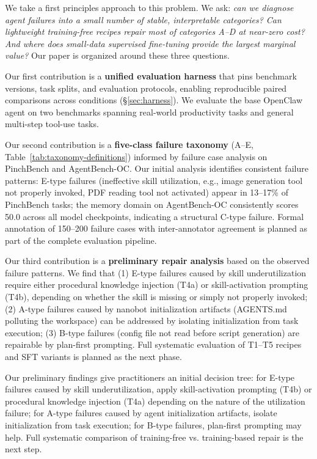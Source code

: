We take a first principles approach to this problem. We ask: \emph{can we diagnose agent failures into a small number of stable, interpretable categories? Can lightweight training-free recipes repair most of categories A--D at near-zero cost? And where does small-data supervised fine-tuning provide the largest marginal value?} Our paper is organized around these three questions.

Our first contribution is a \textbf{unified evaluation harness} that pins benchmark versions, task splits, and evaluation protocols, enabling reproducible paired comparisons across conditions (\S\ref{sec:harness}). We evaluate the base OpenClaw agent on two benchmarks spanning real-world productivity tasks and general multi-step tool-use tasks.

Our second contribution is a \textbf{five-class failure taxonomy} (A--E, Table~\ref{tab:taxonomy-definitions}) informed by failure case analysis on PinchBench and AgentBench-OC. Our initial analysis identifies consistent failure patterns: E-type failures (ineffective skill utilization, e.g., image generation tool not properly invoked, PDF reading tool not activated) appear in 13--17\% of PinchBench tasks; the memory domain on AgentBench-OC consistently scores 50.0 across all model checkpoints, indicating a structural C-type failure. Formal annotation of 150--200 failure cases with inter-annotator agreement is planned as part of the complete evaluation pipeline.

Our third contribution is a \textbf{preliminary repair analysis} based on the observed failure patterns. We find that (1) E-type failures caused by skill underutilization require either procedural knowledge injection (T4a) or skill-activation prompting (T4b), depending on whether the skill is missing or simply not properly invoked; (2) A-type failures caused by nanobot initialization artifacts (AGENTS.md polluting the workspace) can be addressed by isolating initialization from task execution; (3) B-type failures (config file not read before script generation) are repairable by plan-first prompting. Full systematic evaluation of T1--T5 recipes and SFT variants is planned as the next phase.

Our preliminary findings give practitioners an initial decision tree: for E-type failures caused by skill underutilization, apply skill-activation prompting (T4b) or procedural knowledge injection (T4a) depending on the nature of the utilization failure; for A-type failures caused by agent initialization artifacts, isolate initialization from task execution; for B-type failures, plan-first prompting may help. Full systematic comparison of training-free vs. training-based repair is the next step.

